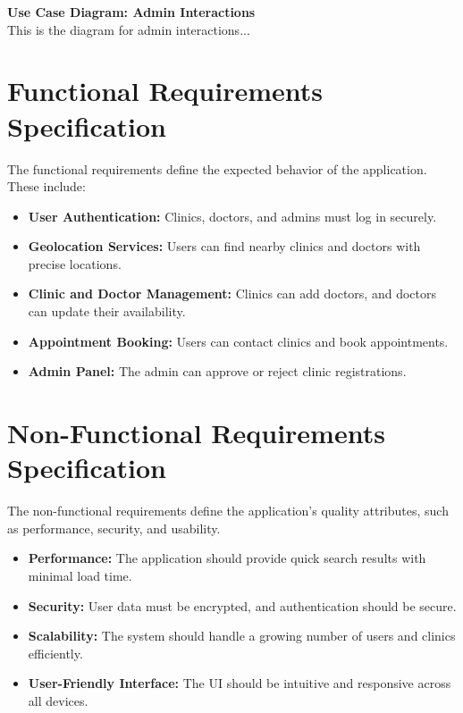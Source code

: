 \documentclass[12pt]{report}
\begin{document}
\vspace{0.5cm}  
\noindent \textbf{Use Case Diagram: Admin Interactions}  
\\This is the diagram for admin interactions...\\  

\section{\textbf{Functional Requirements Specification}}  

\noindent The functional requirements define the expected behavior of the application. These include:  

\begin{itemize}  
    \item \textbf{User Authentication:} Clinics, doctors, and admins must log in securely.  
    \item \textbf{Geolocation Services:} Users can find nearby clinics and doctors with precise locations.  
    \item \textbf{Clinic and Doctor Management:} Clinics can add doctors, and doctors can update their availability.  
    \item \textbf{Appointment Booking:} Users can contact clinics and book appointments.  
    \item \textbf{Admin Panel:} The admin can approve or reject clinic registrations.  
\end{itemize}  

\section{\textbf{Non-Functional Requirements Specification}}  

\noindent The non-functional requirements define the application's quality attributes, such as performance, security, and usability.  

\begin{itemize}  
    \item \textbf{Performance:} The application should provide quick search results with minimal load time.  
    \item \textbf{Security:} User data must be encrypted, and authentication should be secure.  
    \item \textbf{Scalability:} The system should handle a growing number of users and clinics efficiently.  
    \item \textbf{User-Friendly Interface:} The UI should be intuitive and responsive across all devices.  
\end{itemize}  
\end{document}
